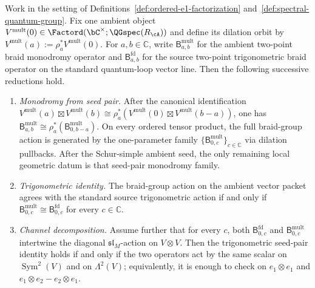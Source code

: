 \begin{theorem}
\label{thm:yangian-dk5-spectral-factorization-seed-mono}%
\label{thm:yangian-dk5-spectral-factorization-seed-trig}%
\label{thm:yangian-dk5-spectral-factorization-seed-channels}%
\label{thm:yangian-dk5-spectral-factorization-seed-single-line}%
\label{thm:yangian-dk5-spectral-factorization-seed-exchange}%
\label{thm:yangian-dk5-spectral-factorization-seed-exchange-mult}%
\label{thm:yangian-dk5-spectral-factorization-seed-alt-mult}%
Work in the setting of
Definitions~\ref{def:ordered-e1-factorization}
and~\ref{def:spectral-quantum-group}. Fix one ambient object
\(V^{\mathrm{mult}}(0)\in \Factord(\bC^\times;\QGspec(R_{\cA}))\)
and define its dilation orbit by
\(V^{\mathrm{mult}}(a):=\rho_a^*V^{\mathrm{mult}}(0)\).
For \(a,b\in\mathbb C\), write
\(\mathsf B_{a,b}^{\mathrm{mult}}\) for the ambient two-point braid
monodromy operator and \(\mathsf B_{a,b}^{\mathrm{fd}}\) for the
source two-point trigonometric braid operator on the standard
quantum-loop vector line. Then the following successive reductions
hold.
\begin{enumerate}[label=\textup{(\alph*)}]
\item\emph{Monodromy from seed pair.}
 After the canonical identification
 \(V^{\mathrm{mult}}(a)\boxtimes V^{\mathrm{mult}}(b)
 \cong \rho_a^*(V^{\mathrm{mult}}(0)\boxtimes V^{\mathrm{mult}}(b-a))\),
 one has
 \(\mathsf B_{a,b}^{\mathrm{mult}}
 \cong \rho_a^*(\mathsf B_{0,b-a}^{\mathrm{mult}})\).
 On every ordered tensor product, the full braid-group action is
 generated by the one-parameter family
 \(\{\mathsf B_{0,c}^{\mathrm{mult}}\}_{c\in\mathbb C}\) via
 dilation pullbacks. After the Schur-simple ambient seed, the only
 remaining local geometric datum is that seed-pair monodromy family.

\item\emph{Trigonometric identity.}
 The braid-group action on the ambient vector packet agrees with the
 standard source trigonometric action if and only if
 \(\mathsf B_{0,c}^{\mathrm{mult}} \cong
 \mathsf B_{0,c}^{\mathrm{fd}}\) for every \(c\in\mathbb C\).

\item\emph{Channel decomposition.}
 Assume further that for every \(c\), both
 \(\mathsf B_{0,c}^{\mathrm{fd}}\) and
 \(\mathsf B_{0,c}^{\mathrm{mult}}\) intertwine the diagonal
 \(\mathfrak{sl}_M\)-action on \(V\otimes V\). Then the
 trigonometric seed-pair identity holds if and only if the two
 operators act by the same scalar on \(\operatorname{Sym}^2(V)\) and
 on \(\Lambda^2(V)\); equivalently, it is enough to check on
 \(e_1\otimes e_1\) and \(e_1\otimes e_2-e_2\otimes e_1\).


\end{enumerate}
\end{theorem}
